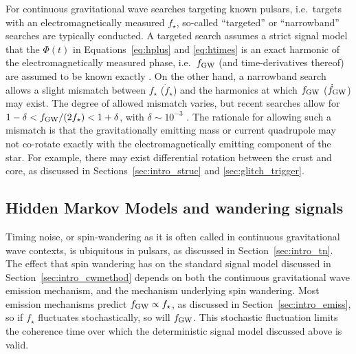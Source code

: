 For continuous gravitational wave searches targeting known pulsars, i.e.~targets with an electromagnetically measured $f_\star$, so-called ``targeted'' or ``narrowband'' searches are typically conducted. A targeted search assumes a strict signal model that the $\Phi(t)$ in Equations~\eqref{eq:hplus} and \eqref{eq:htimes} is an exact harmonic of the electromagnetically measured phase, i.e.~$f_{\rm GW}$ (and time-derivatives thereof) are assumed to be known exactly \citep{o3aknown,o3known}. On the other hand, a narrowband search allows a slight mismatch between $f_\star$ ($\dot{f}_\star$) and the harmonics at which $f_{\rm GW}$ ($\dot{f}_{\rm GW}$) may exist. The degree of allowed mismatch varies, but recent searches allow for $1 - \delta < f_{\rm GW} / (2 f_\star) < 1 + \delta$, with $\delta \sim 10^{-3}$ \citep{o3aknown,o3narrowband}. The rationale for allowing such a mismatch is that the gravitationally emitting mass or current quadrupole may not co-rotate exactly with the electromagnetically emitting component of the star. For example, there may exist differential rotation between the crust and core, as discussed in Sections~\ref{sec:intro_struc} and \ref{sec:glitch_trigger}.

\subsection{Hidden Markov Models and wandering signals} \label{sec:intro_hmm}
Timing noise, or spin-wandering as it is often called in continuous gravitational wave contexts, is ubiquitous in pulsars, as discussed in Section~\ref{sec:intro_tn}. The effect that spin wandering has on the standard signal model discussed in Section~\ref{sec:intro_cwmethod} depends on both the continuous gravitational wave emission mechanism, and the mechanism underlying spin wandering. Most emission mechanisms predict $f_{\rm GW} \propto f_\star$, as discussed in Section~\ref{sec:intro_emiss}, so if $f_\star$ fluctuates stochastically, so will $f_{\rm GW}$. This stochastic fluctuation limits the coherence time over which the deterministic signal model discussed above is valid.

